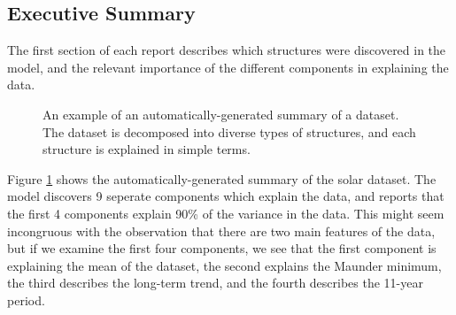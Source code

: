 \documentclass{article} %
\begin{document}
\subsection{Executive Summary}

The first section of each report describes which structures were discovered in the model, and the relevant importance of the different components in explaining the data.

\begin{figure}[h]
\centering
{}
\caption{
An example of an automatically-generated summary of a dataset.  The dataset is decomposed into diverse types of structures, and each structure is explained in simple terms.}
\label{fig:exec}
\end{figure}


Figure \ref{fig:exec} shows the automatically-generated summary of the solar dataset.  The model discovers 9 seperate components which explain the data, and reports that the first 4 components explain 90\% of the variance in the data.  This might seem incongruous with the observation that there are two main features of the data, but if we examine the first four components, we see that the first component is explaining the mean of the dataset, the second explains the Maunder minimum, the third describes the long-term trend, and the fourth describes the 11-year period.
\end{document}
